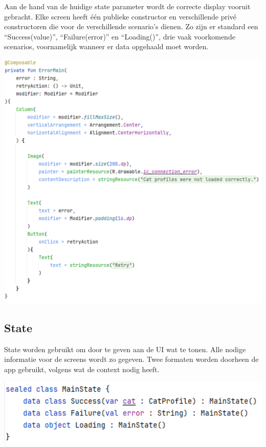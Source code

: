 \documentclass{report}
\begin{document}
Aan de hand van de huidige state parameter wordt de correcte display vooruit gebracht.
Elke screen heeft één publieke constructor en verschillende privé constructoren die voor de verschillende scenario's dienen.
Zo zijn er standard een ``Success(value)'', ``Failure(error)'' en ``Loading()'', drie vaak voorkomende scenarios, voornamelijk wanneer er data opgehaald moet worden.

\begin{center}
    \includegraphics[scale=0.9]{MVVM_Screen}
\end{center}

\subsection{State}
State worden gebruikt om door te geven aan de UI wat te tonen. Alle nodige informatie voor de screens wordt zo gegeven.
Twee formaten worden doorheen de app gebruikt, volgens wat de context nodig heeft.
\begin{center}
    \includegraphics{MVVM_State}
\end{center}
\end{document}
